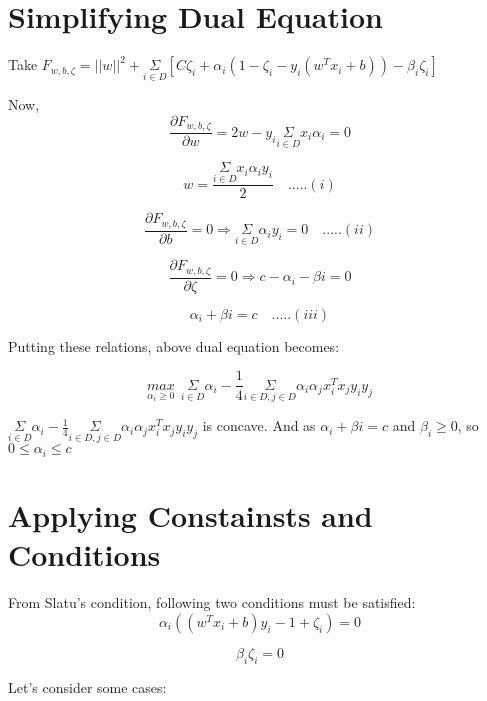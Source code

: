 \documentclass[11pt, twosides]{article}
\begin{document}
\section{Simplifying Dual Equation}

Take $F_{w,b,\zeta} = ||w||^2+ \underset{i\in D}{\Sigma} \left[ C\zeta_i +\alpha_i(1-\zeta_i-y_i(w^Tx_i+b))-\beta_i\zeta_i\right]$

Now, $$\frac{\partial F_{w,b,\zeta}}{\partial w} = 2w - y_{i}\underset{i\in D}{\Sigma}x_{i}\alpha_{i} = 0 $$

$$ w = \frac{\underset{i\in D}{\Sigma}x_{i}\alpha_{i}y_{i}}{2} \hspace{1em}.....(i)$$

$$ \frac{\partial F_{w,b,\zeta}}{\partial b} = 0 \Rightarrow \underset{i\in D}{\Sigma}\alpha_{i}y_{i} = 0 \hspace{1em}.....(ii)$$

$$ \frac{\partial F_{w,b,\zeta}}{\partial \zeta} = 0 \Rightarrow c-\alpha_{i}-\beta{i} = 0 $$

$$ \alpha_{i}+\beta{i}=c \hspace{1em}.....(iii) $$

Putting these relations, above dual equation becomes:

$$ \underset{\alpha_i \geq 0}{max}  \ \ \underset{i\in D}{\Sigma} \alpha_{i} - \frac{1}{4} \underset{i\in D , j\in D}{\Sigma}\alpha_{i}\alpha_{j}x_{i}^{T}x_{j}y_{i}y_{j} $$

$\underset{i\in D}{\Sigma} \alpha_{i} - \frac{1}{4} \underset{i\in D , j\in D}{\Sigma}\alpha_{i}\alpha_{j}x_{i}^{T}x_{j}y_{i}y_{j}$ is concave. And as $\alpha_{i}+\beta{i}=c$ and $\beta_{i}\geq0$, so $0\leq\alpha_{i}\leq c$



\section{Applying Constainsts and Conditions}

From Slatu's condition, following two conditions must be satisfied:
\begin{equation}
 \alpha_{i}( (w^T x_{i} + b)y_{i}-1+\zeta_{i}) =0
\end{equation}

\begin{equation}
 \beta_{i}\zeta_{i} = 0
\end{equation}
    
Let's consider some cases: \\
\end{document}
